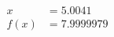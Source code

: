 \documentclass[preview]{standalone}
\begin{document}
\begin{align*}
x &= 5.0041\\f(x) &= 7.9999979
\end{align*}
\end{document}
